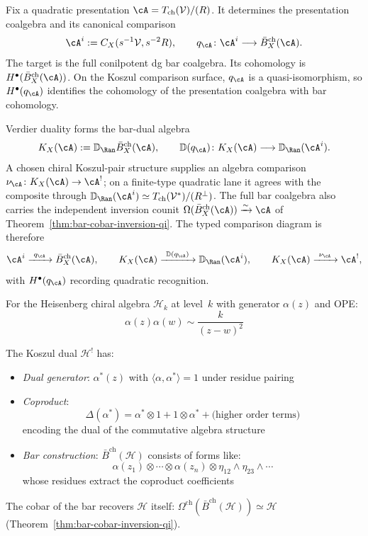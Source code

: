 \begin{remark}\label{rem:koszul-dual-meaning}
Fix a quadratic presentation
$\cA=T_{\mathrm{ch}}(\mathcal V)/(R)$.  It determines the
presentation coalgebra and its canonical comparison
\[
 \cA^i:=C_X(s^{-1}\mathcal V,s^{-2}R),
 \qquad
 q_\cA\colon\cA^i\longrightarrow\bar B^{\mathrm{ch}}_X(\cA).
\]
The target is the full conilpotent dg bar coalgebra.  Its cohomology is
$H^\bullet(\bar B^{\mathrm{ch}}_X(\cA))$.  On the Koszul comparison
surface, $q_\cA$ is a quasi-isomorphism, so
$H^\bullet(q_\cA)$ identifies the cohomology of the presentation
coalgebra with bar cohomology.

Verdier duality forms the bar-dual algebra
\[
 K_X(\cA):=\mathbb D_{\Ran}\bar B^{\mathrm{ch}}_X(\cA),
 \qquad
 \mathbb D(q_\cA)\colon
 K_X(\cA)\longrightarrow\mathbb D_{\Ran}(\cA^i).
\]
A chosen chiral Koszul-pair structure supplies an algebra comparison
$\nu_\cA\colon K_X(\cA)\to\cA^!$; on a finite-type quadratic lane it
agrees with the composite through
$\mathbb D_{\Ran}(\cA^i)\simeq T_{\mathrm{ch}}(\mathcal V^*)/(R^\perp)$.
The full bar coalgebra also carries the independent inversion counit
$\Omega(\bar B^{\mathrm{ch}}_X(\cA))\xrightarrow{\sim}\cA$
of Theorem~\ref{thm:bar-cobar-inversion-qi}.  The typed comparison
diagram is therefore
\[
\cA^i\xrightarrow{\ q_\cA\ }\bar B^{\mathrm{ch}}_X(\cA),
\qquad
K_X(\cA)\xrightarrow{\ \mathbb D(q_\cA)\ }
\mathbb D_{\Ran}(\cA^i),
\qquad
K_X(\cA)\xrightarrow{\ \nu_\cA\ }\cA^!,
\]
with $H^\bullet(q_\cA)$ recording quadratic recognition.
\end{remark}

\begin{example}
For the Heisenberg chiral algebra $\mathcal{H}_k$ at level~$k$ with generator $\alpha(z)$ and OPE:
\[\alpha(z)\alpha(w) \sim \frac{k}{(z-w)^2}\]

The Koszul dual $\mathcal{H}^!$ has:
\begin{itemize}
\item \emph{Dual generator}: $\alpha^*(z)$ with $\langle \alpha, \alpha^* \rangle = 1$ under residue pairing
\item \emph{Coproduct}:
 \[\Delta(\alpha^*) = \alpha^* \otimes 1 + 1 \otimes \alpha^* + \text{(higher order terms)}\]
 encoding the dual of the commutative algebra structure
\item \emph{Bar construction}: $\bar{B}^{\text{ch}}(\mathcal{H})$ consists of forms like:
 \[\alpha(z_1) \otimes \cdots \otimes \alpha(z_n) \otimes \eta_{12} \wedge \eta_{23} \wedge \cdots\]
 whose residues extract the coproduct coefficients
\end{itemize}

The cobar of the bar recovers $\mathcal{H}$ itself: $\Omega^{\text{ch}}(\bar{B}^{\text{ch}}(\mathcal{H})) \simeq \mathcal{H}$ (Theorem~\ref{thm:bar-cobar-inversion-qi}).
\end{example}

